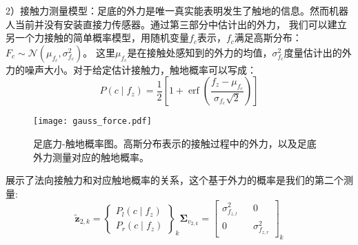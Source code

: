 2）接触力测量模型：足底的外力是唯一真实能表明发生了触地的信息。然而机器人当前并没有安装直接力传感器。通过第三部分中估计出的外力，
我们可以建立另一个力接触的简单概率模型，用随机变量$f_c$表示，$f_c$满足高斯分布：$F_c \sim \mathcal{N}\left(\mu_{f_c}, \sigma_{f_c}^2\right)$。
这里$\mu_{f_c}$是在接触处感知到的外力的均值，$\sigma_{f_c}^2$度量估计出的外力的噪声大小。对于给定估计接触力，触地概率可以写成：
\begin{equation}
    \label{equ:est_force_prob}
    P\left(c \mid f_z\right)=\frac{1}{2}\left[1+\operatorname{erf}\left(\frac{f_z-\mu_{f_c}}{\sigma_{f_c} \sqrt{2}}\right)\right]
\end{equation}
\begin{figure}[htbp]
    \centering
    \texttt{[image: gauss\_force.pdf]}
    \caption{\label{fig:gauss_force}足底力-触地概率图。高斯分布表示的接触过程中的外力，以及足底外力测量对应的触地概率。}
\end{figure}
展示了法向接触力和对应触地概率的关系，这个基于外力的概率是我们的第二个测量:
\begin{equation}
    \label{equ:est_force_noise}
    \tilde{\boldsymbol{z}}_{2, k}=\left\{\begin{array}{c}
        P_l\left(c \mid f_z\right) \\
        P_r\left(c \mid f_z\right)
        \end{array}\right\}_k \boldsymbol{\Sigma}_{v_{2, k}}=\left[\begin{array}{ccc}
        \sigma_{f_{z, l}}^2 & & 0 \\
        0 & & \sigma_{f_{z, r}}^2
        \end{array}\right]_k
\end{equation}

